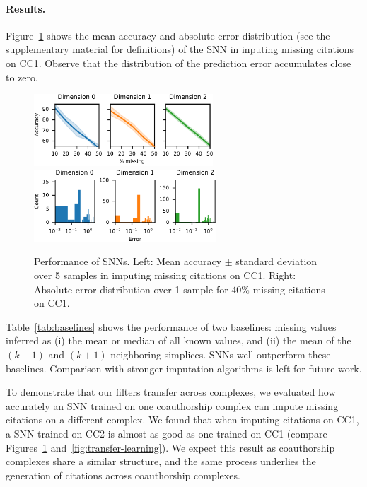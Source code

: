 \paragraph{Results.}
Figure~\ref{fig:accuracy-error} shows the mean accuracy and absolute error distribution (see the supplementary material for definitions) of the SNN in inputing missing citations on CC1. Observe that the distribution of the prediction error accumulates close to zero.

\begin{figure}[htbp]
  \centering
  \includegraphics[height=2.7cm]{figures/foo.pdf}
  \hfill
  \includegraphics[height=2.7cm]{figures/foo-2.pdf}
  \caption{%
    Performance of SNNs.
    Left: Mean accuracy $\pm$ standard deviation over 5 samples in imputing missing citations on CC1.
    Right: Absolute error distribution over 1 sample for $40\%$ missing citations on CC1.
  }\label{fig:accuracy-error}
\end{figure}

Table~\ref{tab:baselines} shows the performance of two baselines: missing values inferred as (i) the mean or median of all known values, and (ii) the mean of the $(k-1)$ and $(k+1)$ neighboring simplices.
SNNs well outperform these baselines.
Comparison with stronger imputation algorithms is left for future work.

To demonstrate that our filters transfer across complexes, we evaluated how accurately an SNN trained on one coauthorship complex can impute missing citations on a different complex.
We found that when imputing citations on CC1, a SNN trained on CC2 is almost as good as one trained on CC1 (compare Figures~\ref{fig:accuracy-error} and~\ref{fig:transfer-learning}).
We expect this result as coauthorship complexes share a similar structure, and the same process underlies the generation of citations across coauthorship complexes.

